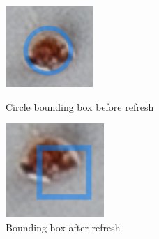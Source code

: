 \documentclass{article}
\begin{document}
 
\begin{figure}[!ht]
    \centering
    \begin{minipage}{0.25\textwidth}
        \includegraphics[width=\textwidth]{limitation/circle.PNG}
        \caption{Circle bounding box before refresh}
        \label{Figure 26}
    \end{minipage}
    \begin{minipage}{0.25\textwidth}
        \includegraphics[width=\textwidth]{limitation/refresh.PNG}
        \caption{Bounding box after refresh}
        \label{Figure 27}
    \end{minipage}

\end{figure}
\end{document}
